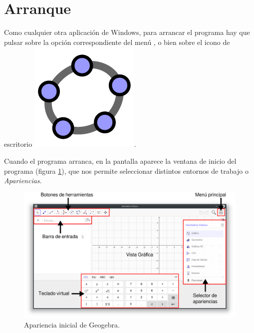 \section{Arranque}
Como cualquier otra aplicación de Windows, para arrancar el programa hay que pulsar sobre la opción correspondiente del menú , o bien sobre el icono de escritorio \includegraphics[scale=0.04]{img/introduccion/geogebra-icon}.

Cuando el programa arranca, en la pantalla aparece la ventana de inicio del programa (figura \ref{g:ventana-inicio}), que nos permite seleccionar distintos entornos de trabajo o \emph{Apariencias}.

\begin{figure}[h!]
\begin{center}
\includegraphics[width=\textwidth]{img/introduccion/start-window}
\caption{Apariencia inicial de Geogebra.} \label{g:ventana-inicio}
\end{center}
\end{figure}

